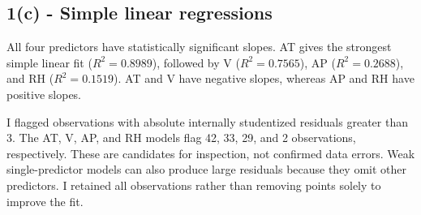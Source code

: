 \documentclass[11pt]{article}
\begin{document}
    \hypertarget{c---simple-linear-regressions}{%
\subsection{1(c) - Simple linear
regressions}\label{c---simple-linear-regressions}}

All four predictors have statistically significant slopes. AT gives the
strongest simple linear fit (\(R^2=0.8989\)), followed by V
(\(R^2=0.7565\)), AP (\(R^2=0.2688\)), and RH (\(R^2=0.1519\)). AT and V
have negative slopes, whereas AP and RH have positive slopes.

I flagged observations with absolute internally studentized residuals
greater than 3. The AT, V, AP, and RH models flag 42, 33, 29, and 2
observations, respectively. These are candidates for inspection, not
confirmed data errors. Weak single-predictor models can also produce
large residuals because they omit other predictors. I retained all
observations rather than removing points solely to improve the fit.
\end{document}
